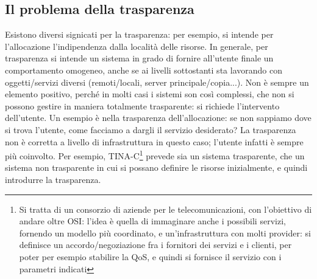 \subsection{Il problema della trasparenza}
Esistono diversi signicati per la trasparenza: per esempio, si intende per l'allocazione l'indipendenza dalla località
delle risorse. In generale, per trasparenza si intende un sistema in grado di fornire all'utente finale un comportamento
omogeneo, anche se ai livelli sottostanti sta lavorando con oggetti/servizi diversi (remoti/locali, server
principale/copia...).
Non è sempre un elemento positivo, perché in molti casi i sistemi son così complessi, che non si possono gestire in
maniera totalmente trasparente: si richiede l'intervento dell'utente. Un esempio è nella trasparenza dell'allocazione:
se non sappiamo dove si trova l'utente, come facciamo a dargli il servizio desiderato? La trasparenza non è corretta
a livello di infrastruttura in questo caso; l'utente infatti è sempre più coinvolto.
Per esempio, TINA-C\footnote{Si tratta di un consorzio di aziende per le telecomunicazioni, con l'obiettivo di andare
oltre OSI: l'idea è quella di immaginare anche i possibili servizi, fornendo un modello più coordinato, e
un'infrastruttura con molti provider: si definisce un accordo/negoziazione fra i fornitori dei servizi e i clienti,
per poter per esempio stabilire la QoS, e quindi si fornisce il servizio con i parametri indicati} prevede sia un
sistema trasparente, che un sistema non trasparente in cui si possano definire le risorse inizialmente, e quindi
introdurre la trasparenza.
